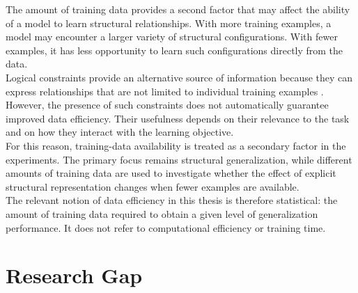 \noindent
The amount of training data provides a second factor that may affect the ability of a model to learn structural relationships. With more training examples, a model may encounter a larger variety of structural configurations. With fewer examples, it has less opportunity to learn such configurations directly from the data.
\\
Logical constraints provide an alternative source of information because they can express relationships that are not limited to individual training examples \cite{badreddine2022logic}. However, the presence of such constraints does not automatically guarantee improved data efficiency. Their usefulness depends on their relevance to the task and on how they interact with the learning objective.
\\
For this reason, training-data availability is treated as a secondary factor in the experiments. The primary focus remains structural generalization, while different amounts of training data are used to investigate whether the effect of explicit structural representation changes when fewer examples are available.
\\
The relevant notion of data efficiency in this thesis is therefore statistical: the amount of training data required to obtain a given level of generalization performance. It does not refer to computational efficiency or training time.

\section{Research Gap}

